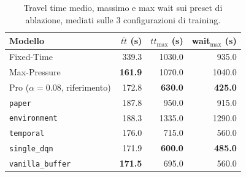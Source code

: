 \begin{table}[htbp]
  \centering
  \begin{tabular}{@{}lrrr@{}}
    \toprule
    Modello                          & $\overline{tt}$ (s) & $tt_{\max}$ (s) & wait$_{\max}$ (s) \\
    \midrule
    Fixed-Time                       & 339.3               & 1030.0          & 935.0             \\
    Max-Pressure                     & \textbf{161.9}      & 1070.0          & 1040.0            \\
    Pro ($\alpha=0.08$, riferimento) & 172.8               & \textbf{630.0}  & \textbf{425.0}    \\
    \texttt{paper}                   & 187.8               & 950.0           & 915.0             \\
    \texttt{environment}             & 188.3               & 1335.0          & 1290.0            \\
    \texttt{temporal}                & 176.0               & 715.0           & 560.0             \\
    \texttt{single\_dqn}             & 171.9               & \textbf{600.0}  & \textbf{485.0}    \\
    \texttt{vanilla\_buffer}         & \textbf{171.5}      & 695.0           & 560.0             \\
    \bottomrule
  \end{tabular}
  \caption{Travel time medio, massimo e max wait sui preset
    di ablazione, mediati sulle 3 configurazioni di training.}
  \label{tab:ablation-train}
\end{table}

